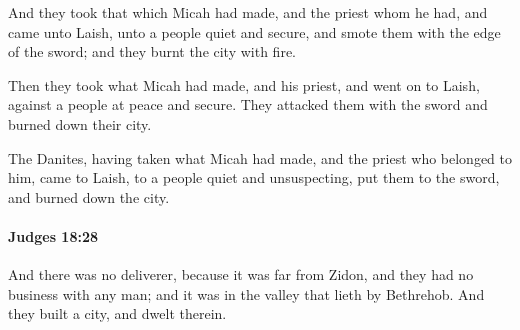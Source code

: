			\begin{versebox}
					\item[BHS] 
					\item[ASV] And they took that which Micah had made, and the priest whom he had, and came unto Laish, unto a people quiet and secure, and smote them with the edge of the sword; and they burnt the city with fire.
					\item[NIV] Then they took what Micah had made, and his priest, and went on to Laish, against a people at peace and secure. They attacked them with the sword and burned down their city.
					\item[NRSV] The Danites, having taken what Micah had made, and the priest who belonged to him, came to Laish, to a people quiet and unsuspecting, put them to the sword, and burned down the city.
			\end{versebox}

		\paragraph{Judges 18:28} %
			\label{JUDGES-18-28}

			And there was no deliverer, because it was far from Zidon, and they had no business with any man; and it was in the valley that lieth by Bethrehob. And they built a city, and dwelt therein.


